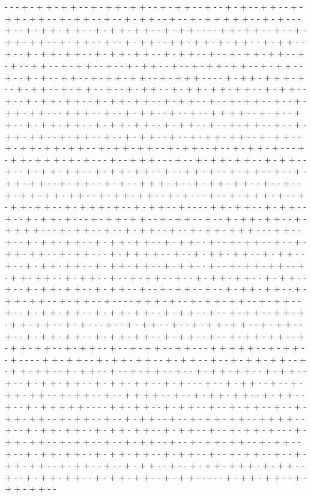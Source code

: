 - - - + - + + - + + - - + - + + - + + - - + - + + - - + - - + - + - - + + - - + - + + - + + - - + - + + - - + - - + - + + - - + - - + - + + + + + - - + - + - - - + - - + - + + - + + - - + - + + - + + - - + - + + - - - - + + - + + - - + - - + - + + - + + - - + - + + - - + - - + - + + - - + + - + + - + - + + - - + - + + - - + - - + - + + - + + - - + - + + - + + - - + - + + - - + - - + - + + - + + - - + - + - - + + - - + - + + - - + - - + - + + - - + - - + - + + - + + - - + - + + - - + - - + - + - - + + - - + - + + - + + - - + - + + + - - - - + - + + - + + + - + - - + - + + - - + - + + - - + - - + - + + - - + - + + - + + - + + - - + - + + - - + - - + - + + - + + - - + - + + - + + - - + - + + - - + - - + - + + - - + - - + - + + - + + - - - + + + - - + - - + - + + - - + - - + - - + + + + - - + - + - - + + - - + - + + - + + - - + - + + - + + - - + - + + - - + - - + - + + - - + - - + - + + - + + - - + - + + - - + - - + - + + - - + - - + - + + - + + - - + - + + - - + - + + - + + - + + - - + - + + - + + - - + - + + - - + - - + - + + - + - - - + - + + - + + + - + - + - - - + - - + + + - - - + - - + - + + - + + - - + - + + - - + - - + - + + - + + - - + - + + - + + - - + - - + + - + - - + - + + - - + - - + - + + - + + - - + - + + - - + - + - - + + + - + - - + - + + - + + - - + - - + - - + - + + - + + - + + - - + - + + - + + - - + - + - - - + - - + - + + + - + - - + - + + - + + - - + - + + + - + - - + - + + - - + - - - - + + - + + - - + - + + - - + - - + - + + - + - - - + - + + - + + - - + - + + - - + - - + - + + - + + - - + - + + + + - - - + - + + - - + - - + - + + - - + - - + - + + - + + + - - - + + - - + - - + - + + - + + - - + - + + - + + - - + - + + - - + - - + - + + - - + - - + - + + - + + - - + - + + - - - + - + + + + - - + - - + - + + - + + - - + - + + - - + - - + - + + - + + - - + - + + - + + - - + - + + - - + - - + - + + - + + - - + - + + - + + - - + - + + - - + - - + - + + - - + - - + - + + - + + - - + - + + - - + - - + - + + - + + - - + - + + - - + - - + - + + - - + - - + - + + - + + - - + - + + - + + - - + - + + - - + - - - - + + + - + - - + - + + - + + - - + - + + - - + - - + - + + - + + - - + - + + - + + - - + - + + - - + - - + - + + - - + + - + - + + - + + - - + - + - - - + - - + - + + - - + - - + - + + - + + - - + - + + - - + - - + - + + - + + - - + - + + - + + - - + - + + - - + - - + - + + - + + - - + - + + - + + - - + - + + - - + - - + - + + - - + + - - - + + + + + - - + - + + - - + - - - - + + - + + - - + - + + - + + - - + - + + - - + - - + - + + - + + - - + - + + - + + - - + - + + - - + - - + - + + - - + - - + - + + - + + - - + - + + - - + - - + - + + - + + - - + - + + - + + - - + - + - - - + - - + - + + - - + - - + - + + - + + - - + - + + - - + - - + + + + - - + - - + - + + - + + - - + - + + - - + - - + - + + + + + - - - - + + - + + - - + - + + - - + - - + - + + - - + - - + - + + - + + - - + - + + - - + - - + - + + - - + - - + - + + - + + - - + + + + - - + - - + - + + - + + - - + - + + - + + - - + - + + - - + - - + - + + - + - - - + - + + - + + - - + - + + - - + - - + - + + - - + - - + - + + - + + - - + - + + - - + - - + - + + - + + - - + - + + - + + - - + - + + - - + - - + - + + - - + - - + - + + - + + - - + - + + - - + - - + - + + - - + - - + - + + - + + + - + - + + - - + - - + - + + - + + - - + - + + - + + - - + - + + - - - - - + - + + - + + - - + - + + - + + - - 